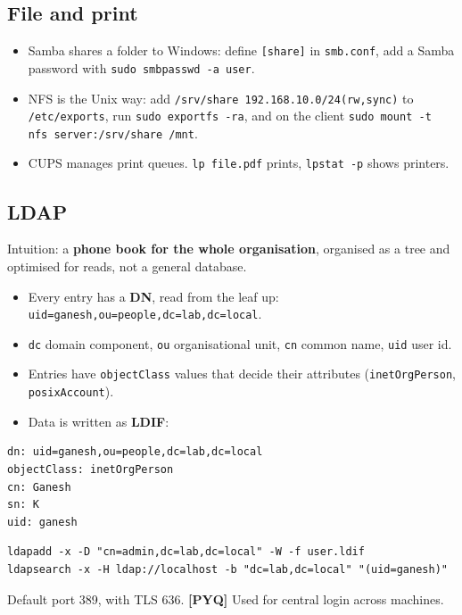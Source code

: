 \documentclass[11pt,a4paper]{article}
\newcommand{\pyq}{\textcolor{ember}{\scriptsize\textbf{[PYQ]}}}
\begin{document}
\subsection{File and print}
\begin{itemize}
\item Samba shares a folder to Windows: define \texttt{[share]} in \texttt{smb.conf}, add a Samba password with \texttt{sudo smbpasswd -a user}.
\item NFS is the Unix way: add \texttt{/srv/share 192.168.10.0/24(rw,sync)} to \texttt{/etc/exports}, run \texttt{sudo exportfs -ra}, and on the client \texttt{sudo mount -t nfs server:/srv/share /mnt}.
\item CUPS manages print queues. \texttt{lp file.pdf} prints, \texttt{lpstat -p} shows printers.
\end{itemize}
\subsection{LDAP}
Intuition: a \textbf{phone book for the whole organisation}, organised as a tree and optimised for reads, not a general database.

\begin{itemize}
\item Every entry has a \textbf{DN}, read from the leaf up: \texttt{uid=ganesh,ou=people,dc=lab,dc=local}.
\item \texttt{dc} domain component, \texttt{ou} organisational unit, \texttt{cn} common name, \texttt{uid} user id.
\item Entries have \texttt{objectClass} values that decide their attributes (\texttt{inetOrgPerson}, \texttt{posixAccount}).
\item Data is written as \textbf{LDIF}:
\end{itemize}
\begin{lstlisting}
dn: uid=ganesh,ou=people,dc=lab,dc=local
objectClass: inetOrgPerson
cn: Ganesh
sn: K
uid: ganesh
\end{lstlisting}
\begin{lstlisting}
ldapadd -x -D "cn=admin,dc=lab,dc=local" -W -f user.ldif
ldapsearch -x -H ldap://localhost -b "dc=lab,dc=local" "(uid=ganesh)"
\end{lstlisting}
Default port 389, with TLS 636. \pyq{} Used for central login across machines.
\end{document}
